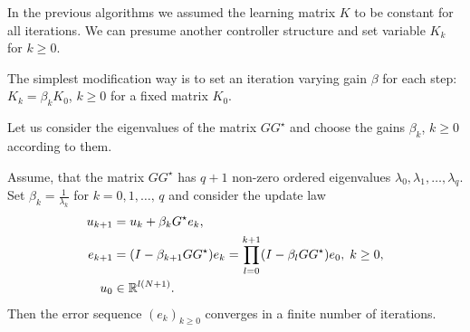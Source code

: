 In the previous algorithms we assumed the learning matrix $K$ to be constant for all iterations.
We can presume another controller structure and set variable $K_k$ for $k\geq 0$. 

The simplest modification way is to set an iteration varying gain $\beta$ for each step: $K_k = \beta_k K_0$, $k\geq 0$ for a fixed matrix $K_0$. 

Let us consider the eigenvalues of the matrix $GG^\star$ and choose the gains $\beta_k$, $k \geq 0$ according to them. 

\begin{theo}
	Assume, that the matrix $GG^\star$ has $q+1$ non-zero ordered eigenvalues $\lambda_0, \lambda_1, \dots ,  \lambda_q$. Set $\beta_k = \frac{1}{\lambda_k}$ for $k = 0, 1, \dots, \, q$ and consider the update law
	\begin{align}
	\label{eq:cl_var0}
	\begin{split}
	u_{k+1} &= u_k + \beta_k G^\star e_k, \\
	e _{k+1} &= (I - \beta_{k+1}  GG^\star) e_{k}  = \prod_{l = 0}^{k+1} (I - \beta_{l}  GG^\star) e_0, \; k\geq 0,\\
	u_0 &\in {\mathbb{R}}^{l (N+1)}.
	\end{split}
	\end{align}
	Then the error sequence $(e_k)_{k\geq 0}$ converges in a finite number of iterations.     
\end{theo}
